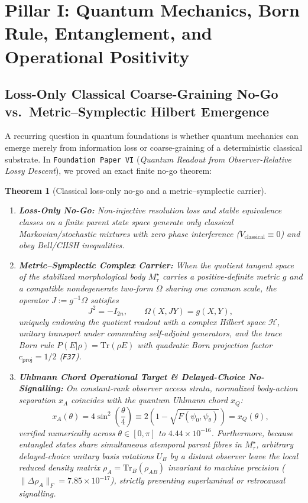 \documentclass[11pt,a4paper]{article}
\newtheorem{theorem}{Theorem}[section]
\begin{document}
\section{Pillar I: Quantum Mechanics, Born Rule, Entanglement, and Operational Positivity}

\subsection{Loss-Only Classical Coarse-Graining No-Go vs.\ Metric--Symplectic Hilbert Emergence}

A recurring question in quantum foundations is whether quantum mechanics can emerge merely from information loss or coarse-graining of a deterministic classical substrate. In \texttt{Foundation Paper VI} (\emph{Quantum Readout from Observer-Relative Lossy Descent}), we proved an exact finite no-go theorem:

\begin{theorem}[Classical loss-only no-go and a metric--symplectic carrier]
\label{thm:quantum-readout}
\begin{enumerate}[label=(\roman*),leftmargin=1.8em,itemsep=2pt]
\item \textbf{Loss-Only No-Go:} Non-injective resolution loss and stable equivalence classes on a finite parent state space generate only classical Markovian/stochastic mixtures with zero phase interference ($V_{\mathrm{classical}}\equiv 0$) and obey Bell/CHSH inequalities.
\item \textbf{Metric--Symplectic Complex Carrier:} When the quotient tangent space of the stabilized morphological body $M_\tau^\star$ carries a positive-definite metric $g$ and a compatible nondegenerate two-form $\Omega$ sharing one common scale, the operator $J := g^{-1}\Omega$ satisfies
\begin{equation}
J^2 = -I_{2n},\qquad \Omega(X,JY) = g(X,Y),
\end{equation}
uniquely endowing the quotient readout with a complex Hilbert space $\mathcal{H}$, unitary transport under commuting self-adjoint generators, and the trace Born rule $P(E|\rho)=\mathrm{Tr}(\rho E)$ with quadratic Born projection factor $c_{\mathrm{proj}}=1/2$ (\texttt{F37}).
\item \textbf{Uhlmann Chord Operational Target \& Delayed-Choice No-Signalling:} On constant-rank observer access strata, normalized body-action separation $x_A$ coincides with the quantum Uhlmann chord $x_Q$:
\begin{equation}
x_A(\theta) = 4\sin^2\!\left(\frac{\theta}{4}\right) \equiv 2\!\left(1 - \sqrt{F(\psi_0,\psi_\theta)}\right) = x_Q(\theta),
\label{eq:uhlmann-chord}
\end{equation}
verified numerically across $\theta\in[0,\pi]$ to $4.44\times 10^{-16}$. Furthermore, because entangled states share simultaneous atemporal parent fibres in $M_\tau^\star$, arbitrary delayed-choice unitary basis rotations $U_B$ by a distant observer leave the local reduced density matrix $\rho_A = \mathrm{Tr}_B(\rho_{AB})$ invariant to machine precision ($\|\Delta\rho_A\|_F = 7.85\times 10^{-17}$), strictly preventing superluminal or retrocausal signalling.
\end{enumerate}
\end{theorem}
\end{document}
